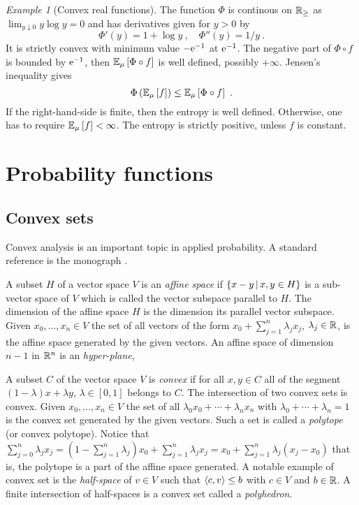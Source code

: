 \documentclass[12pt,a4paper]{amsart}
\theoremstyle{plain}%
\theoremstyle{definition}
\theoremstyle{remark}
\newtheorem{example}{Example}
\begin{document}
\begin{example}[Convex real functions]
The function $\Phi$ is continous
on $\mathbb{R}_\geq$ as $\lim_{y \downarrow 0} y \log y = 0$ and has
derivatives given for $y > 0$ by
\begin{equation*}
  \Phi'(y) = 1 + \log y \ , \quad \Phi''(y)= 1/y \ .  
\end{equation*}
It is strictly convex with minimum value $-\mathrm{e}^{-1}$ at
$\mathrm{e}^{-1}$. The negative part of $\Phi\circ f$ is bounded by
$\mathrm{e}^{-1}$, then $\operatorname{\mathbb E}_{\mu}\left[\Phi\circ f\right]$ is well defined,
possibly $+\infty$. Jensen's inequality gives
\begin{equation*}
  \Phi\left(\operatorname{\mathbb E}_{\mu}\left[f\right]\right) \leq \operatorname{\mathbb E}_{\mu}\left[\Phi\circ f\right] \ .
\end{equation*}
If the right-hand-side is finite, then the entropy is well
defined. Otherwise, one has to require $\operatorname{\mathbb E}_{\mu}\left[f\right] < \infty$. The
entropy is strictly positive, unless $f$ is constant.
\end{example}

\section{Probability functions}

\subsection{Convex sets}
\label{sec:aside:-convex-set}

Convex analysis is an important topic in applied probability. A
standard reference is the monograph \cite{barvinok:2002}.

A subset $H$ of a vector space $V$ is an \emph{affine space} if
$\left\{x-y \, \middle| \, x,y \in H \right\}$ is a sub-vector space of $V$ which is called
the vector subspace parallel to $H$. The dimension of the affine space
$H$ is the dimension its parallel vector subspace. Given
$x_0,\dots,x_n \in V$ the set of all vectors of the form
$x_0 + \sum_{j=1}^n \lambda_j x_j$, $\lambda_j \in \mathbb{R}$, is the
affine space generated by the given vectors. An affine space of
dimension $n-1$ in $\mathbb{R}^n$ is an \emph{hyper-plane},

A subset $C$ of the vector space $V$ is \emph{convex} if for all $x,y \in C$ all of the segment $(1-\lambda)x + \lambda y$, $\lambda \in [0,1]$ belongs to $C$. The intersection of two convex sets is convex. Given $x_0,\dots,x_n \in V$ the set of all $\lambda_0 x_0 + \cdots +\lambda_n x_n$ with $\lambda_0 + \cdots + \lambda_n = 1$ is the convex set generated by the given vectors. Such a set is called a \emph{polytope} (or convex polytope). Notice that $\sum_{j=0}^n \lambda_j x_j = (1 - \sum_{j=1}^n \lambda_j) x_0 + \sum_{j=1}^n \lambda_j x_j = x_0 + \sum_{j=1}^n \lambda_j(x_j-x_0)$ that is, the polytope is a part of the affine space generated. A notable example of convex set is the \emph{half-space} of $v \in V$ such that $\left\langle c,v\right\rangle \leq b$ with $c \in V$ and $b \in \mathbb{R}$. A finite intersection of half-spaces is a convex set called a \emph{polyhedron}. 
\end{document}
